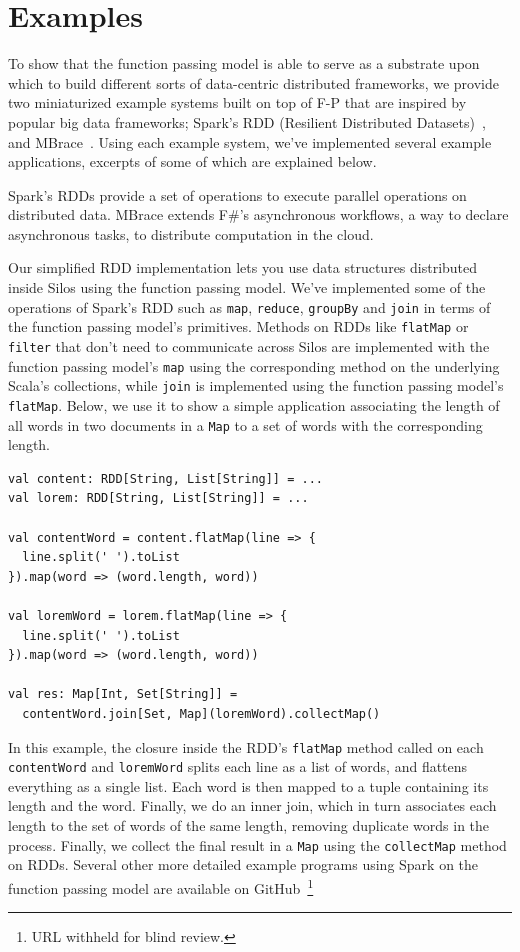 \documentclass[10pt]{sigplanconf}
\theoremstyle{definition}
\theoremstyle{definition}
\begin{document}
\section{Examples}
\label{sec:examples}

To show that the function passing model is able to serve as a substrate upon
which to build different sorts of data-centric distributed frameworks, we
provide two miniaturized example systems built on top of F-P that are inspired
by popular big data frameworks; Spark's RDD (Resilient Distributed
Datasets)~\cite{Spark}, and MBrace~\cite{MBrace}. Using each example system,
we've implemented several example applications, excerpts of some of which are
explained below.

Spark's RDDs provide a set of operations to execute parallel operations on
distributed data. MBrace extends F\#’s asynchronous workflows, a way to declare
asynchronous tasks, to distribute computation in the cloud.

Our simplified RDD implementation lets you use data structures distributed
inside Silos using the function passing model. We've implemented some of the
operations of Spark’s RDD such as \verb|map|, \verb|reduce|, \verb|groupBy| and
\verb|join| in terms of the function passing model's primitives. Methods on RDDs
like \verb|flatMap| or \verb|filter| that don’t need to communicate across Silos
are implemented with the function passing model’s \verb|map| using the
corresponding method on the underlying Scala’s collections, while \verb|join| is
implemented using the function passing model’s \verb|flatMap|. Below, we use it
to show a simple application associating the length of all words in two
documents in a \verb|Map| to a set of words with the corresponding length.

\begin{lstlisting}
val content: RDD[String, List[String]] = ...
val lorem: RDD[String, List[String]] = ...

val contentWord = content.flatMap(line => {
  line.split(' ').toList
}).map(word => (word.length, word))

val loremWord = lorem.flatMap(line => {
  line.split(' ').toList
}).map(word => (word.length, word))

val res: Map[Int, Set[String]] =
  contentWord.join[Set, Map](loremWord).collectMap()
\end{lstlisting}

In this example, the closure inside the RDD's \verb|flatMap| method called on
each \verb|contentWord| and \verb|loremWord| splits each line as a list of
words, and flattens everything as a single list. Each word is then mapped to a
tuple containing its length and the word. Finally, we do an inner join, which in
turn associates each length to the set of words of the same length, removing
duplicate words in the process. Finally, we collect the final result in a
\verb|Map| using the \verb|collectMap| method on RDDs. Several other more
detailed example programs using Spark on the function passing model are
available on GitHub~\footnote{URL withheld for blind review.}
\end{document}
